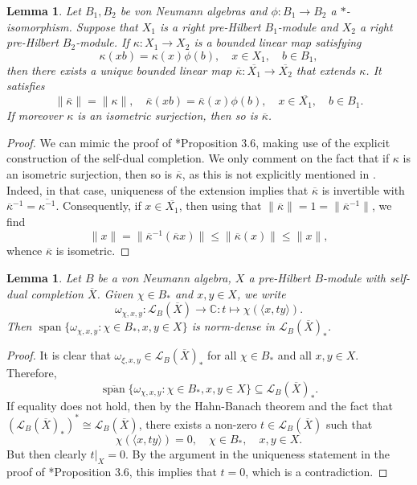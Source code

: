\documentclass[reqno]{amsart}
\numberwithin{equation}{section}
\newtheorem{Lem}[Theorem]{Lemma}
\begin{document}
\begin{Lem}\label{self-duality}
    Let $B_1, B_2$ be von Neumann algebras and $\phi: B_1\to B_2$ a $*$-isomorphism. Suppose that $X_1$ is a right pre-Hilbert $B_1$-module and $X_2$ a right pre-Hilbert $B_2$-module. If $\kappa: X_1\to X_2$ is a bounded linear map satisfying 
    $$\kappa(xb) = \kappa(x)\phi(b), \quad x \in X_1, \quad b \in B_1,$$
    then there exists a unique bounded linear map
    $\overline{\kappa}: \overline{X_1}\to \overline{X_2}$
    that extends $\kappa$. It satisfies
    $$\|\overline{\kappa}\|= \|\kappa\|, \quad \overline{\kappa}(x b)= \overline{\kappa}(x)\phi(b), \quad x \in \overline{X_1}, \quad b\in B_1.$$
    If moreover $\kappa$ is an isometric surjection, then so is $\overline{\kappa}$.
\end{Lem}
\begin{proof}
    We can mimic the proof of \cite{Pa73}*{Proposition 3.6}, making use of the explicit construction of the self-dual completion. We only comment on the fact that if $\kappa$ is an isometric surjection, then so is $\overline{\kappa}$, as this is not explicitly mentioned in \cite{Pa73}. Indeed, in that case, uniqueness of the extension implies that $\overline{\kappa}$ is invertible with $\overline{\kappa}^{-1}= \overline{\kappa^{-1}}$. Consequently, if $x\in \overline{X_1}$, then using that $\|\overline{\kappa}\| = 1 = \|\overline{\kappa}^{-1}\|$, we find
    $$\|x\| = \|\overline{\kappa}^{-1}(\overline{\kappa} x)\| \le \|\overline{\kappa}(x)\|\le \|x\|,$$
    whence $\overline{\kappa}$ is isometric.
\end{proof}

\begin{Lem}\label{s-topology}
    Let $B$ be a von Neumann algebra, $X$ a pre-Hilbert $B$-module with self-dual completion $\overline{X}$. Given $\chi \in B_*$ and $x,y \in X$, we write
$$\omega_{\chi, x,y}: \mathscr{L}_{B}(\overline{X})\to \mathbb{C}: t \mapsto \chi(\langle x, ty\rangle).$$
Then $\operatorname{span}\{\omega_{\chi, x, y}: \chi\in B_*, x,y \in X\}$ is norm-dense in $\mathscr{L}_B(\overline{X})_*$.
\end{Lem}
\begin{proof} It is clear 
that $\omega_{\xi, x,y}\in \mathscr{L}_B(\overline{X})_*$ for all $\chi\in B_*$ and all $x,y \in X$. Therefore, 
$$\overline{\operatorname{span}}\{\omega_{\chi, x,y}: \chi\in B_*, x,y \in X\}\subseteq \mathscr{L}_B(\overline{X})_*.$$
If equality does not hold, then by the Hahn-Banach theorem and the fact that $(\mathscr{L}_B(\overline{X})_*)^*\cong \mathscr{L}_B(\overline{X})$, there exists a non-zero $t\in \mathscr{L}_B(\overline{X})$ such that
   $$\chi(\langle x,ty\rangle)= 0, \quad \chi \in B_*, \quad x,y\in X.$$
   But then clearly $t\vert_X = 0$. By the argument in the uniqueness statement in the proof of \cite{Pa73}*{Proposition 3.6}, this implies that $t= 0$, which is a contradiction.
\end{proof}
\end{document}
